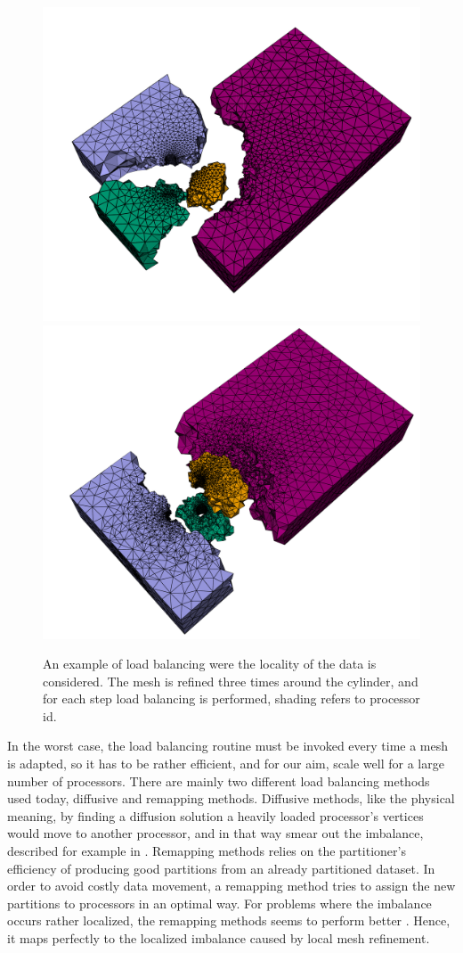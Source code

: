 \begin{figure}[bt]
\begin{center}
  \includegraphics[width=0.49\columnwidth]{chapters/hoffman-4/pdf/cr.pdf}
  \includegraphics[width=0.49\columnwidth]{chapters/hoffman-4/pdf/cr2.pdf}
\end{center}
\caption{An example of load balancing were the locality of the data is considered. The mesh is refined three times around the cylinder, and for each step load balancing is performed, shading refers to processor id.}
\end{figure}

In the worst case, the load balancing routine must be invoked every
time a mesh is adapted, so it has to be rather efficient, and for our
aim, scale well for a large number of processors. There are mainly two
different load balancing methods used today, diffusive and remapping
methods. Diffusive methods, like the physical meaning, by finding a
diffusion solution a heavily loaded processor's vertices would move to
another processor, and in that way smear out the imbalance, described
for example in \cite{HuBlake1995, SchloegelKarypisEtAl1997}. Remapping
methods relies on the partitioner's efficiency of producing good
partitions from an already partitioned dataset. In order to avoid
costly data movement, a remapping method tries to assign the new
partitions to processors in an optimal way. For problems where the
imbalance occurs rather localized, the remapping methods seems to
perform better \cite{SchloegelKarypisKumarEtAl1998}. Hence, it maps
perfectly to the localized imbalance caused by local mesh refinement.

